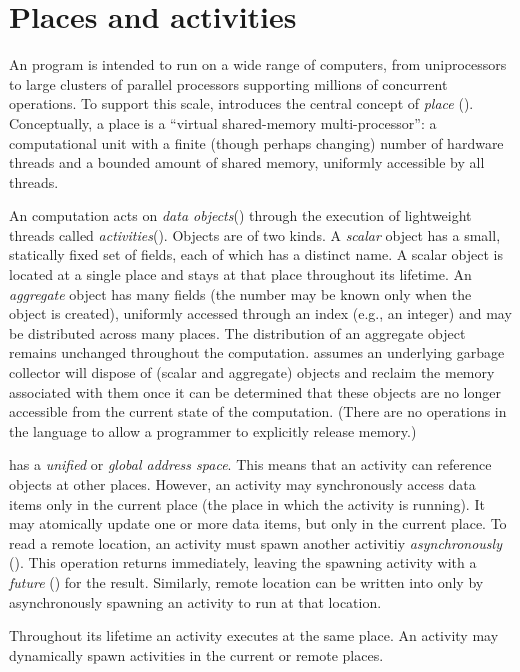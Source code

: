 \section{Places and activities}
An \Xten{} program is intended to run on a wide range of computers,
from uniprocessors to large clusters of parallel processors supporting
millions of concurrent operations. To support this scale, \Xten{}
introduces the central concept of \emph{place} ().
Conceptually, a place is a ``virtual shared-memory multi-processor'':
a computational unit with a finite (though perhaps changing) number of
hardware threads and a bounded amount of shared memory, uniformly
accessible by all threads.

An \Xten{} computation acts on \emph{data
objects}() through the execution of lightweight
threads called \emph{activities}().  Objects are
of two kinds. A \emph{scalar} object has a small, statically fixed set
of fields, each of which has a distinct name. A scalar object is
located at a single place and stays at that place throughout its
lifetime.  An \emph{aggregate} object has many fields (the number may
be known only when the object is created), uniformly accessed through
an index (e.g., an integer) and may be distributed across many
places. The distribution of an aggregate object remains unchanged
throughout the computation. \Xten{} assumes an underlying garbage
collector will dispose of (scalar and aggregate) objects and reclaim
the memory associated with them once it can be determined that these
objects are no longer accessible from the current state of the
computation. (There are no operations in the language to allow a
programmer to explicitly release memory.)

{}\Xten{} has a \emph{unified} or \emph{global address space}. This
means that an activity can reference objects at other places.
However, an activity may synchronously access data items only in the
current place (the place in which the activity is running). It may
atomically update one or more data items, but only in the current
place.  To read a remote location, an activity must spawn another
activitiy \emph{asynchronously} (). This
operation returns immediately, leaving the spawning activity with a
\emph{future} () for the result. Similarly, remote
location can be written into only by asynchronously spawning an
activity to run at that location.

Throughout its lifetime an activity executes at the same place. An
activity may dynamically spawn activities in the current or remote
places.


